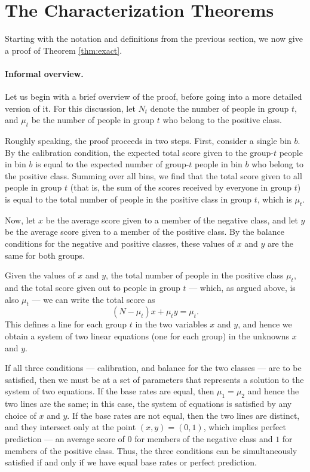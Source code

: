 \documentclass[11pt]{article}
\newcommand{\xhdr}[1]{\vspace{-0.2in} \paragraph*{\bf {#1}.}}
\begin{document}
\section{The Characterization Theorems}

Starting with the notation and definitions from the previous section,
we now give a proof of Theorem \ref{thm:exact}.

\xhdr{Informal overview}
Let us begin with a brief overview of the proof, 
before going into a more detailed version of it.  
For this discussion, 
let $N_t$ denote the number of people in group $t$, and 
$\mu_t$ be the number of people in group $t$ who belong to the positive class.

Roughly speaking, the proof proceeds in two steps.
First, consider a single bin $b$.
By the calibration condition, the expected total score given to 
the group-$t$ people in bin $b$ is equal to the expected number
of group-$t$ people in bin $b$ who belong to the positive class.
Summing over all bins, we find that the total score given to all
people in group $t$ (that is, the sum of the scores received by
everyone in group $t$) is equal to the total number of people
in the positive class in group $t$, which is $\mu_t$.

Now, let $x$ be the average score given to a member of the negative class, 
and let $y$ be the average score given to a member of the positive class.
By the balance conditions for the negative and positive classes,
these values of $x$ and $y$ are the same for both groups.

Given the values of $x$ and $y$, the total number of people in the
positive class $\mu_t$, and the total score given out to people
in group $t$ --- which, as argued above, is also $\mu_t$ ---
we can write the total score as 
$$(N - \mu_t) x + \mu_t y = \mu_t.$$
This defines a line for each group $t$ in the two variables $x$ and $y$, 
and hence we 
obtain a system of two linear equations (one for each group) in the 
unknowns $x$ and $y$.

If all three conditions --- calibration, and balance for the
two classes --- are to be satisfied, then we must be at a set
of parameters that represents a solution to the system of two equations.
If the base rates are equal, then $\mu_1 = \mu_2$ and hence the
two lines are the same; in this case, 
the system of equations is satisfied by any choice of $x$ and $y$.
If the base rates are not equal, then the two lines are distinct, and
they intersect only at the point $(x,y) = (0,1)$, which implies
perfect prediction --- an average score of $0$ for members of
the negative class and $1$ for members of the positive class.
Thus, the three conditions can be simultaneously satisfied if
and only if we have equal base rates or perfect prediction.
\end{document}
